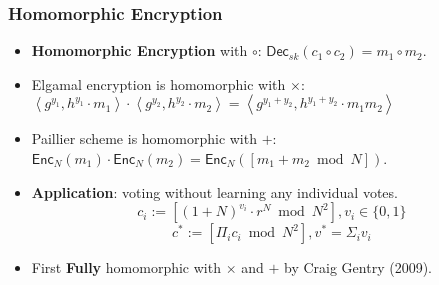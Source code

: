 \begin{frame}\frametitle{Homomorphic Encryption}
\begin{itemize}
\item \textbf{Homomorphic Encryption} with $\circ$: $\mathsf{Dec}_{sk}(c_1\circ c_2)=m_1\circ m_2$. 
\item Elgamal encryption is homomorphic with $\times$: $\left<g^{y_1},h^{y_1}\cdot m_1\right>\cdot \left<g^{y_2},h^{y_2}\cdot m_2\right> = \left<g^{y_1+y_2},h^{y_1+y_2}\cdot m_1m_2\right>$
\item Paillier scheme is homomorphic with $+$: $\mathsf{Enc}_N(m_1) \cdot \mathsf{Enc}_N(m_2) = \mathsf{Enc}_N([m_1+m_2 \bmod N])$.
\item \textbf{Application}: voting without learning any individual votes.
\[c_i := [(1+N)^{v_i}\cdot r^N \bmod N^2], v_i \in \{0,1\}\]
\[c^* := [\Pi_{i} c_i \bmod N^2], v^* = \Sigma_{i} v_i \]
\item First \textbf{Fully} homomorphic with $\times$ and $+$ by Craig Gentry (2009).
\end{itemize}
\end{frame}
